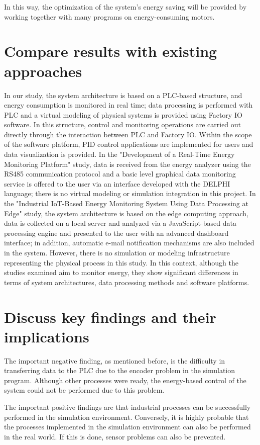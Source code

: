 In this way, the optimization of the system's energy saving will be provided by working together with many programs on energy-consuming motors.
\medskip

\section{Compare results with existing approaches}
In our study, the system architecture is based on a PLC-based structure, and energy consumption is monitored in real time; data processing is performed with PLC and a virtual modeling of physical systems is provided using Factory IO software. In this structure, control and monitoring operations are carried out directly through the interaction between PLC and Factory IO. Within the scope of the software platform, PID control applications are implemented for users and data visualization is provided. In the "Development of a Real-Time Energy Monitoring Platform" study, data is received from the energy analyzer using the RS485 communication protocol and a basic level graphical data monitoring service is offered to the user via an interface developed with the DELPHI language; there is no virtual modeling or simulation integration in this project. In the "Industrial IoT-Based Energy Monitoring System Using Data Processing at Edge" study, the system architecture is based on the edge computing approach, data is collected on a local server and analyzed via a JavaScript-based data processing engine and presented to the user with an advanced dashboard interface; in addition, automatic e-mail notification mechanisms are also included in the system. However, there is no simulation or modeling infrastructure representing the physical process in this study. In this context, although the studies examined aim to monitor energy, they show significant differences in terms of system architectures, data processing methods and software platforms.
\medskip

\section{Discuss key findings and their implications}
The important negative finding, as mentioned before, is the difficulty in transferring data to the PLC due to the encoder problem in the simulation program. Although other processes were ready, the energy-based control of the system could not be performed due to this problem.

The important positive findings are that industrial processes can be successfully performed in the simulation environment. Conversely, it is highly probable that the processes implemented in the simulation environment can also be performed in the real world. If this is done, sensor problems can also be prevented.
\medskip

\clearpage